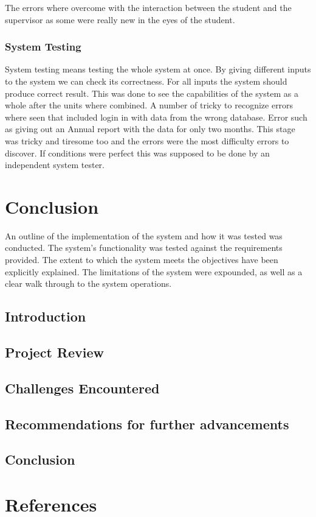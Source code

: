 \documentclass[12pt]{report}
\begin{document}
	The errors where overcome with the interaction between the student and the supervisor as some were really new in the eyes of the student.
	
	\subsection{System Testing}
	System testing means testing the whole system at once. By giving different inputs to the system we can check its correctness. For all inputs the system should produce correct result.
	This was done to see the capabilities of the system as a whole after the units where combined. A number of tricky to recognize errors where seen that included login in with data from the wrong database. Error such as giving out an Annual report with the data for only two months. This stage was tricky and tiresome too and the errors were the most difficulty errors to discover. If conditions were perfect this was supposed to be done by an independent system tester.
	
	
	
	\chapter{Conclusion}
	An outline of the implementation of the system and how it was tested was conducted. The system’s functionality was tested against the requirements provided. The extent to which the system meets the objectives have been explicitly explained. The limitations of the system were expounded, as well as a clear walk through to the system operations.
	\section{Introduction}
	\section{Project Review}
	\section{Challenges Encountered}
	\section{Recommendations for further advancements}
	\section{Conclusion}
	
	\chapter{References}
	
\end{document}
